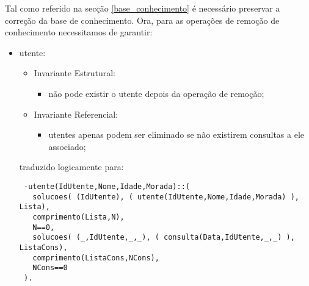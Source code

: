 \documentclass[
  oneside,
  10pt, a4paper,
  footinclude=true,
  headinclude=true,
  cleardoublepage=empty
]{scrbook}
\begin{document}
Tal como referido na secção \ref{base_conhecimento} é necessário preservar a correção da base de conhecimento. Ora, para as operações de remoção de conhecimento necessitamos de garantir:
\begin{itemize}

\item   utente:
\begin{itemize}
\item        Invariante Estrutural:
\begin{itemize}
\item           não pode existir o utente depois da operação de remoção;
\end{itemize}
\item        Invariante Referencial:
\begin{itemize}
\item         utentes apenas podem ser eliminado se não existirem consultas a ele associado;
\end{itemize}

\end{itemize}

traduzido logicamente para:
\begin{lstlisting}
 -utente(IdUtente,Nome,Idade,Morada)::(
   solucoes( (IdUtente), ( utente(IdUtente,Nome,Idade,Morada) ), Lista),
   comprimento(Lista,N),
   N==0,
   solucoes( (_,IdUtente,_,_), ( consulta(Data,IdUtente,_,_) ), ListaCons),
   comprimento(ListaCons,NCons),
   NCons==0
 ).
\end{lstlisting}






\end{itemize}
\end{document}
